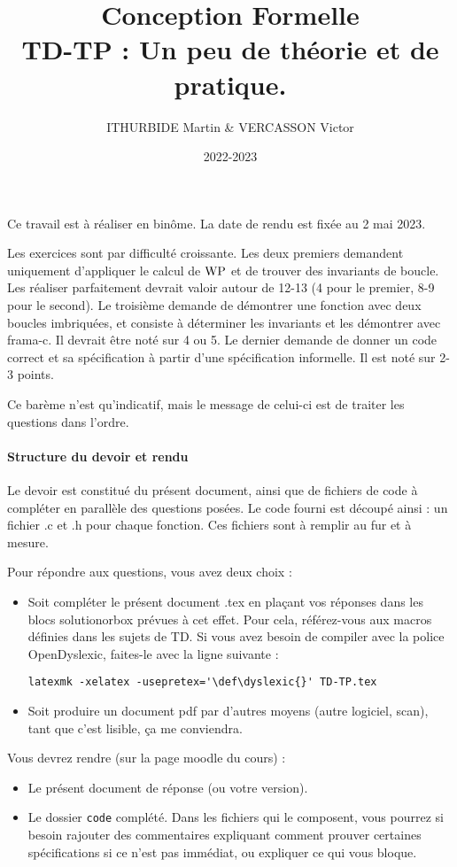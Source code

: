 \documentclass[11pt,answers]{exam}
\author{ITHURBIDE Martin \& VERCASSON Victor}
\date{2022-2023}
\title{{\bf Conception Formelle} \\ TD-TP : Un peu de théorie et de pratique.}
\begin{document}
\maketitle

Ce travail est à réaliser en binôme. La date de rendu est fixée au 2 mai 2023.


Les exercices sont par difficulté croissante. Les deux premiers demandent uniquement d’appliquer le calcul de $\mathrm{WP}$ et de trouver des invariants de boucle.
Les réaliser parfaitement devrait valoir autour de 12-13 (4 pour le premier, 8-9 pour le second).
Le troisième demande de démontrer une fonction avec deux boucles imbriquées, et consiste à déterminer les invariants et les démontrer avec frama-c. Il devrait être noté sur 4 ou 5.
Le dernier demande de donner un code correct et sa spécification à partir d’une spécification informelle. Il est noté sur 2-3 points.

Ce barème n’est qu’indicatif, mais le message de celui-ci est de traiter les questions dans l’ordre.

\paragraph{Structure du devoir et rendu}

Le devoir est constitué du présent document, ainsi que de fichiers de code à compléter en parallèle des questions posées.
Le code fourni est découpé ainsi : un fichier .c et .h pour chaque fonction.
Ces fichiers sont à remplir au fur et à mesure.

Pour répondre aux questions, vous avez deux choix :
\begin{itemize}
    \item Soit compléter le présent document .tex en plaçant vos réponses dans les blocs solutionorbox prévues à cet effet. Pour cela, référez-vous aux macros définies dans les sujets de TD. Si vous avez besoin de compiler avec la police OpenDyslexic, faites-le avec la ligne suivante : 
    
    \verb#latexmk -xelatex -usepretex='\def\dyslexic{}' TD-TP.tex#
    \item Soit produire un document pdf par d’autres moyens (autre logiciel, scan), tant que c’est lisible, ça me conviendra.
\end{itemize}

Vous devrez rendre (sur la page moodle du cours) :
\begin{itemize}
    \item Le présent document de réponse (ou votre version).
    \item Le dossier \texttt{code} complété. Dans les fichiers qui le composent, vous pourrez si besoin rajouter des commentaires expliquant comment prouver certaines spécifications si ce n’est pas immédiat, ou expliquer ce qui vous bloque.
\end{itemize}
\end{document}
